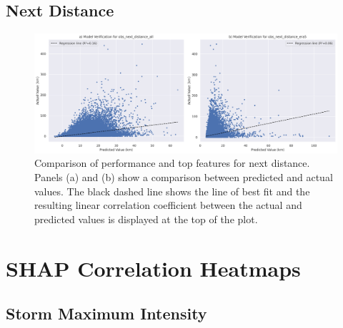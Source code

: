 \clearpage 

\subsection{Next Distance}

\begin{figure}[ht]
    \centering
    \includegraphics[width=\textwidth]{../figures/generated/experiments/obs_next_distance/obs_next_distance_summary.png}
    \caption{Comparison of performance and top features for next distance. Panels (a) and (b) show a comparison between predicted and actual values. The black dashed line shows the line of best fit and the resulting linear correlation coefficient between the actual and predicted values is displayed at the top of the plot.}
    \label{fig:obs_distance_summary}
\end{figure}

\clearpage 

\section{SHAP Correlation Heatmaps}
\label{appn:shap-heatmaps}

\subsection{Storm Maximum Intensity}
\label{appn:shap-heatmaps-smi}
    
